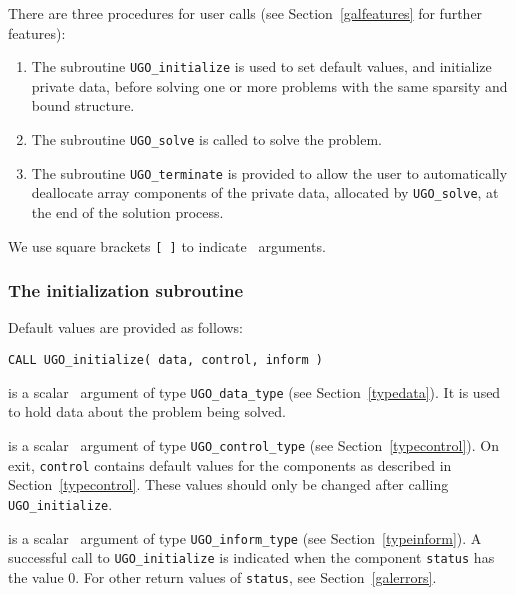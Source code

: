 \documentclass{galahad}
\newcommand{\packagename}{UGO}
\begin{document}




\galarguments
There are three procedures for user calls
(see Section~\ref{galfeatures} for further features):

\begin{enumerate}
\item The subroutine
      {\tt \packagename\_initialize}
      is used to set default values, and initialize private data,
      before solving one or more problems with the
      same sparsity and bound structure.
\item The subroutine
      {\tt \packagename\_solve}
      is called to solve the problem.
\item The subroutine
      {\tt \packagename\_terminate}
      is provided to allow the user to automatically deallocate array
      components of the private data, allocated by
      {\tt \packagename\_solve},
      at the end of the solution process.
\end{enumerate}
We use square brackets {\tt [ ]} to indicate \optional\ arguments.


\subsubsection{The initialization subroutine}\label{subinit}
 Default values are provided as follows:
\vspace*{1mm}

\hspace{8mm}
{\tt CALL \packagename\_initialize( data, control, inform )}

\vspace*{-2mm}
\begin{description}

 is a scalar \intentinout\ argument of type
{\tt \packagename\_data\_type}
(see Section~\ref{typedata}). It is used to hold data about the problem being
solved.

 is a scalar \intentout\ argument of type
{\tt \packagename\_control\_type}
(see Section~\ref{typecontrol}).
On exit, {\tt control} contains default values for the components as
described in Section~\ref{typecontrol}.
These values should only be changed after calling
{\tt \packagename\_initialize}.

 is a scalar \intentout\ argument of type
{\tt \packagename\_inform\_type}
(see Section~\ref{typeinform}). A successful call to
{\tt \packagename\_initialize}
is indicated when the  component {\tt status} has the value 0.
For other return values of {\tt status}, see Section~\ref{galerrors}.

\end{description}
\end{document}
